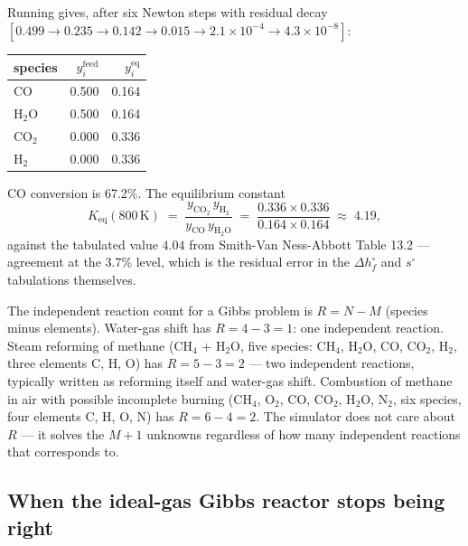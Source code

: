 \documentclass[11pt,a4paper]{article}
\begin{document}
Running 
gives, after six Newton steps with residual decay
$[0.499 \to 0.235 \to 0.142 \to 0.015 \to 2.1{\times}10^{-4} \to
4.3{\times}10^{-8}]$:

\begin{center}\small
\begin{tabular}{lrr}
\toprule
species   & $y_i^{\mathrm{feed}}$ & $y_i^{\mathrm{eq}}$\\
\midrule
CO        & 0.500 & 0.164\\
H$_2$O    & 0.500 & 0.164\\
CO$_2$    & 0.000 & 0.336\\
H$_2$     & 0.000 & 0.336\\
\bottomrule
\end{tabular}
\end{center}

CO conversion is 67.2\%.  The equilibrium constant
\begin{equation}
   K_{\mathrm{eq}}(800\,\mathrm{K})
   \;=\; \frac{y_{\mathrm{CO_2}}\,y_{\mathrm{H_2}}}
              {y_{\mathrm{CO}}\,y_{\mathrm{H_2O}}}
   \;=\; \frac{0.336 \times 0.336}{0.164 \times 0.164}
   \;\approx\; 4.19,
\end{equation}
against the tabulated value $4.04$ from Smith-Van Ness-Abbott Table
13.2 --- agreement at the 3.7\% level, which is the residual error in
the $\Delta h_f^{\circ}$ and $s^{\circ}$ tabulations themselves.

\begin{intuition}
The independent reaction count for a Gibbs problem is $R = N - M$
(species minus elements).  Water-gas shift has $R = 4 - 3 = 1$: one
independent reaction.  Steam reforming of methane (CH$_4$ + H$_2$O,
five species: CH$_4$, H$_2$O, CO, CO$_2$, H$_2$, three elements C, H,
O) has $R = 5 - 3 = 2$ --- two independent reactions, typically
written as reforming itself and water-gas shift.  Combustion of
methane in air with possible incomplete burning (CH$_4$, O$_2$,
CO, CO$_2$, H$_2$O, N$_2$, six species, four elements C, H, O, N)
has $R = 6 - 4 = 2$.  The simulator does not care about $R$ ---
it solves the $M+1$ unknowns regardless of how many independent
reactions that corresponds to.
\end{intuition}

\subsection{When the ideal-gas Gibbs reactor stops being right}
\end{document}
